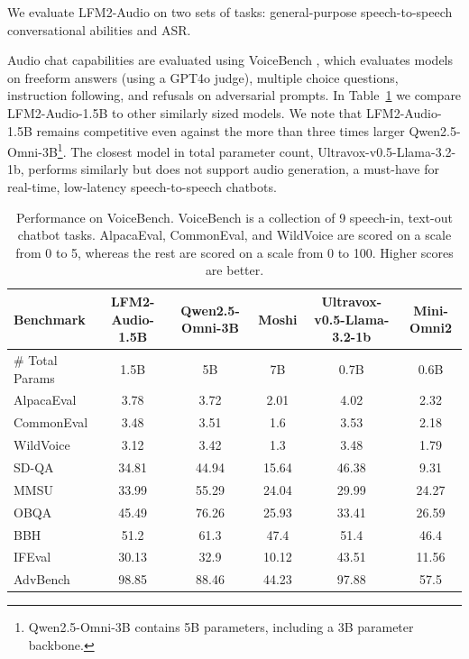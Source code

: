 \documentclass{article}
\begin{document}
We evaluate LFM2-Audio on two sets of tasks: general-purpose speech-to-speech conversational abilities and ASR.

Audio chat capabilities are evaluated using VoiceBench \citep{chen2024voicebench}, which evaluates models on freeform answers (using a GPT4o judge), multiple choice questions, instruction following, and refusals on adversarial prompts. In Table~\ref{tab:audio_VB} we compare LFM2-Audio-1.5B to other similarly sized models.
We note that LFM2-Audio-1.5B remains competitive even against the more than three times larger Qwen2.5-Omni-3B\footnote{Qwen2.5-Omni-3B contains 5B parameters, including a 3B parameter backbone.}. The closest model in total parameter count, Ultravox-v0.5-Llama-3.2-1b, performs similarly but does not support audio generation, a must-have for real-time, low-latency speech-to-speech chatbots.

\begin{table}
\centering
\small
\begin{tabular}{lccccc}
\toprule
\textbf{Benchmark} & \textbf{LFM2-Audio-1.5B} & \textbf{Qwen2.5-Omni-3B} & \textbf{Moshi} & \textbf{Ultravox-v0.5-Llama-3.2-1b} & \textbf{Mini-Omni2} \\
\midrule
\# Total Params & 1.5B & 5B & 7B & 0.7B & 0.6B \\
\midrule
AlpacaEval   & 3.78 & 3.72  & 2.01  & 4.02  & 2.32  \\
CommonEval   & 3.48 & 3.51  & 1.6   & 3.53  & 2.18  \\
WildVoice    & 3.12 & 3.42  & 1.3   & 3.48  & 1.79  \\
SD-QA        & 34.81 & 44.94 & 15.64 & 46.38 & 9.31  \\
MMSU         & 33.99 & 55.29 & 24.04 & 29.99 & 24.27 \\
OBQA         & 45.49 & 76.26 & 25.93 & 33.41 & 26.59 \\
BBH          & 51.2 & 61.3  & 47.4  & 51.4  & 46.4  \\
IFEval       & 30.13 & 32.9  & 10.12 & 43.51 & 11.56 \\
AdvBench     & 98.85 & 88.46 & 44.23 & 97.88 & 57.5  \\
\bottomrule
\end{tabular}
\caption{Performance on VoiceBench. VoiceBench is a collection of 9 speech-in, text-out chatbot tasks. AlpacaEval, CommonEval, and WildVoice are scored on a scale from 0 to 5, whereas the rest are scored on a scale from 0 to 100. Higher scores are better.}
\label{tab:audio_VB}
\end{table}
\end{document}
